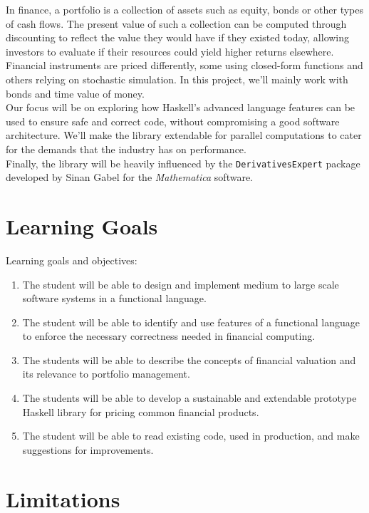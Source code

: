 \documentclass[11pt]{article}
\begin{document}
In finance, a portfolio is a collection of assets such as equity, bonds or other
types of cash flows. The present value of such a collection can be computed through
discounting to reflect the value they would have if they existed today, allowing
investors to evaluate if their resources could yield higher returns elsewhere.
Financial instruments are priced differently, some using closed-form functions and
others relying on stochastic simulation. In this project, we'll mainly work with bonds and
time value of money.\\

Our focus will be on exploring how Haskell's advanced language features can be used
to ensure safe and correct code, without compromising a good software architecture.
We'll make the library extendable for parallel computations to cater for the
demands that the industry has on performance.\\

Finally, the library will be heavily influenced by the {\tt DerivativesExpert} package developed by Sinan Gabel for the \emph{Mathematica} software\cite{Mathematica:DerivativesExpert}.

\section*{Learning Goals}

Learning goals and objectives:

\begin{enumerate}
\item The student will be able to design and implement medium to large scale software systems in a functional language. %
\item The student will be able to identify and use features of a functional language to enforce the necessary correctness needed in financial computing. %
\item The students will be able to describe the concepts of financial valuation and its relevance to portfolio management. %
\item The students will be able to develop a sustainable and extendable prototype Haskell library for pricing common financial products. %
\item The student will be able to read existing code, used in production, and make suggestions for improvements.
\end{enumerate}

\section*{Limitations}
\end{document}
